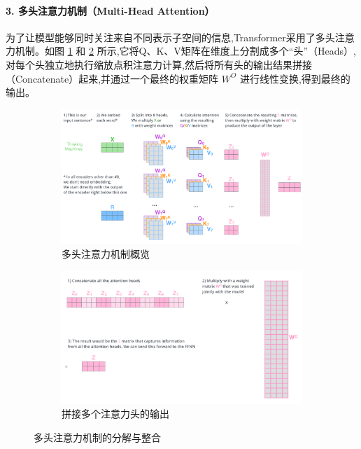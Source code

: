 \paragraph{3. 多头注意力机制（Multi-Head Attention）}
为了让模型能够同时关注来自不同表示子空间的信息,Transformer采用了多头注意力机制。如图 \ref{fig:multi_head_overview} 和 \ref{fig:multi_head_concat} 所示,它将Q、K、V矩阵在维度上分割成多个“头”（Heads）,对每个头独立地执行缩放点积注意力计算,然后将所有头的输出结果拼接（Concatenate）起来,并通过一个最终的权重矩阵 $W^O$ 进行线性变换,得到最终的输出。
\begin{figure}[H]
    \centering
    \begin{subfigure}[b]{0.48\textwidth}
        \centering
        \includegraphics[width=\textwidth]{figures/T3.png}
        \caption{多头注意力机制概览}
        \label{fig:multi_head_overview}
    \end{subfigure}
    \hfill
    \begin{subfigure}[b]{0.48\textwidth}
        \centering
        \includegraphics[width=\textwidth]{figures/T4.png}
        \caption{拼接多个注意力头的输出}
        \label{fig:multi_head_concat}
    \end{subfigure}
    \caption{多头注意力机制的分解与整合}
    \label{fig:multi_head_process}
\end{figure}

